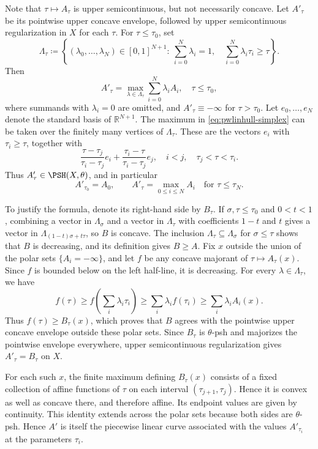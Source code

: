 \begin{remark}\label{rmk:pwlinhull}
Note that $\tau\mapsto A_{\tau}$ is upper semicontinuous, but not necessarily concave.
Let $A'_{\tau}$ be its pointwise upper concave envelope, followed by upper semicontinuous regularization in $X$ for each $\tau$. For $\tau\leq\tau_0$, set
\[
\Lambda_{\tau}\coloneqq\left\{(\lambda_0,\ldots,\lambda_N)\in[0,1]^{N+1}:\ \sum_{i=0}^N\lambda_i=1,\quad \sum_{i=0}^N\lambda_i\tau_i\geq\tau\right\}.
\]
Then
\begin{equation}\label{eq:pwlinhull-simplex}
A'_{\tau}=\max_{\lambda\in\Lambda_{\tau}}\sum_{i=0}^N\lambda_i A_i,\quad \tau\leq\tau_0,
\end{equation}
where summands with $\lambda_i=0$ are omitted, and $A'_{\tau}\equiv-\infty$ for $\tau>\tau_0$.
Let $e_0,\ldots,e_N$ denote the standard basis of $\mathbb R^{N+1}$. The maximum in \eqref{eq:pwlinhull-simplex} can be taken over the finitely many vertices of $\Lambda_{\tau}$. These are the vectors $e_i$ with $\tau_i\geq\tau$, together with
\[
\frac{\tau-\tau_j}{\tau_i-\tau_j}e_i+\frac{\tau_i-\tau}{\tau_i-\tau_j}e_j,
\quad i<j,\quad \tau_j<\tau<\tau_i.
\]
Thus $A'_{\tau}\in\PSH(X,\theta)$, and in particular
\[
A'_{\tau_0}=A_0,\qquad A'_{\tau}=\max_{0\leq i\leq N}A_i\quad\text{for }\tau\leq\tau_N.
\]

To justify the formula, denote its right-hand side by $B_{\tau}$. If $\sigma,\tau\leq\tau_0$ and $0<t<1$, combining a vector in $\Lambda_{\sigma}$ and a vector in $\Lambda_{\tau}$ with coefficients $1-t$ and $t$ gives a vector in $\Lambda_{(1-t)\sigma+t\tau}$, so $B$ is concave. The inclusion $\Lambda_{\tau}\subseteq\Lambda_{\sigma}$ for $\sigma\leq\tau$ shows that $B$ is decreasing, and its definition gives $B\geq A$. Fix $x$ outside the union of the polar sets $\{A_i=-\infty\}$, and let $f$ be any concave majorant of $\tau\mapsto A_{\tau}(x)$. Since $f$ is bounded below on the left half-line, it is decreasing. For every $\lambda\in\Lambda_{\tau}$, we have
\[
f(\tau)\geq f\left(\sum_i\lambda_i\tau_i\right)
\geq\sum_i\lambda_i f(\tau_i)
\geq\sum_i\lambda_i A_i(x).
\]
Thus $f(\tau)\geq B_{\tau}(x)$, which proves that $B$ agrees with the pointwise upper concave envelope outside these polar sets. Since $B_{\tau}$ is $\theta$-psh and majorizes the pointwise envelope everywhere, upper semicontinuous regularization gives $A'_{\tau}=B_{\tau}$ on $X$.

For each such $x$, the finite maximum defining $B_{\tau}(x)$ consists of a fixed collection of affine functions of $\tau$ on each interval $(\tau_{j+1},\tau_j)$. Hence it is convex as well as concave there, and therefore affine. Its endpoint values are given by continuity. This identity extends across the polar sets because both sides are $\theta$-psh. Hence $A'$ is itself the piecewise linear curve associated with the values $A'_{\tau_i}$ at the parameters $\tau_i$.
\end{remark}

